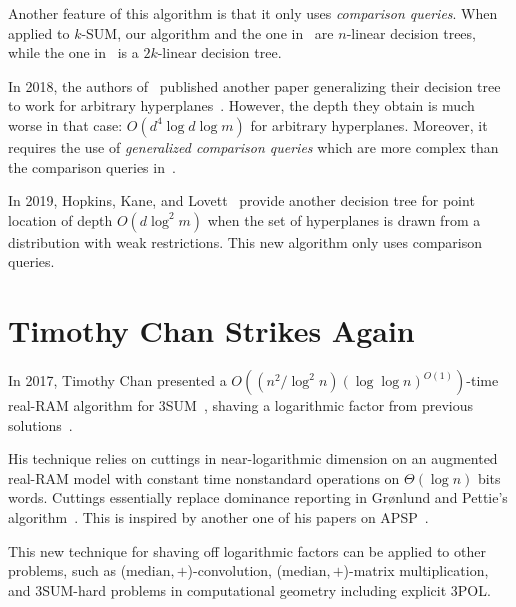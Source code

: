 Another feature of this algorithm is that it only uses \emph{comparison
queries}. When applied to \(k\)-SUM, our algorithm and the one in~\cite{ES17} are \(n\)-linear
decision trees, while the one in~\cite{KLM18} is a \(2k\)-linear decision tree.

In 2018, the authors of~\cite{KLM18} published another paper generalizing their
decision tree to work for arbitrary hyperplanes~\cite{KLM18b}. However,
the depth they obtain is much worse in that case: $O(d^4 \log d \log m)$ for
arbitrary hyperplanes. Moreover, it requires the use of \emph{generalized
comparison queries} which are more complex than the comparison queries
in~\cite{KLM18}.

In 2019,  Hopkins, Kane, and Lovett~\cite{HKL19} provide another decision
tree for point location of depth \(O(d \log^2 m)\) when the set of
hyperplanes is drawn from a distribution with weak restrictions. This new
algorithm only uses comparison queries.

\section{Timothy Chan Strikes Again}

In 2017, Timothy Chan presented a
\(O((n^2 / \log^2 n)(\log \log n)^{O(1)})\)-time real-RAM algorithm for
3SUM~\cite{Ch18}, shaving a logarithmic factor from previous solutions~\cite{Fr15,GS15}.

His technique relies on cuttings in near-logarithmic dimension on an augmented
real-RAM model with constant time nonstandard operations on $\Theta(\log n)$
bits words. Cuttings essentially replace dominance reporting in Gr\o nlund and
Pettie's algorithm~\cite{GP18}.
This is inspired by another one of his papers on APSP~\cite{Cha10}.

This new technique for shaving off logarithmic factors
can be applied to other problems, such as (\(\text{median}, +\))-convolution,
(\(\text{median}, +\))-matrix multiplication, and 3SUM-hard problems in
computational geometry including explicit 3POL.
